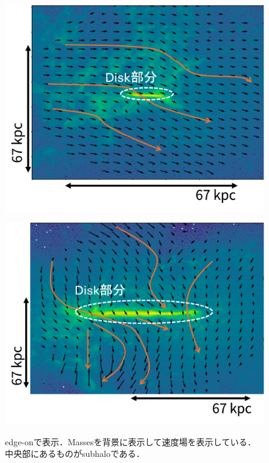 \documentclass[main.tex]{subfiles}
\begin{document}
	\begin{figure}[htbp]
		\centering
		\begin{minipage}[b]{0.45\linewidth}
			\centering
			\includegraphics[width=\linewidth]{pic/outflow_subhalo388544}
			\label{fig:outflowsubhalo388544}
		\end{minipage}
		\begin{minipage}[b]{0.45\linewidth}
			\centering
			\includegraphics[width=\linewidth]{pic/outflow_subhalo421555}
			\label{fig:outflowsubhalo421555}
		\end{minipage}
		\captionsetup{width=.9\linewidth}
		\caption{edge-onで表示．Massesを背景に表示して速度場を表示している．中央部にあるものがsubhaloである．}
		\label{fig:outflowsubhalo}
	\end{figure}
	
\end{document}
